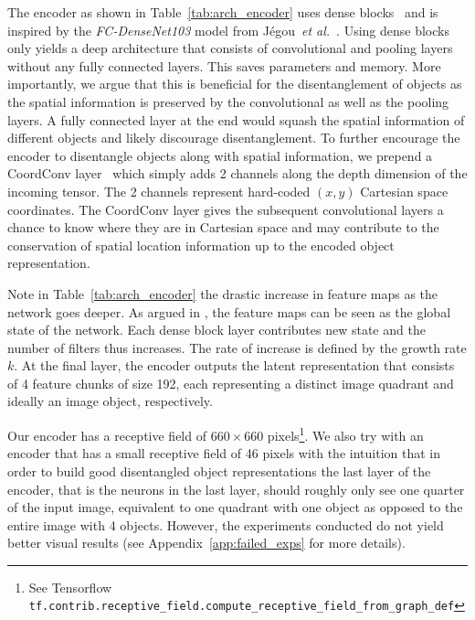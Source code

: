 \documentclass[12pt,a4paper]{article}
\begin{document}
The encoder as shown in Table~\ref{tab:arch_encoder} uses dense blocks~\cite{DenseNet} and is inspired by the \textit{FC-DenseNet103} model from Jégou~\textit{et al.}~\cite{Tiramisu}. Using dense blocks only yields a deep architecture that consists of convolutional and pooling layers without any fully connected layers. This saves parameters and memory. More importantly, we argue that this is beneficial for the disentanglement of objects as the spatial information is preserved by the convolutional as well as the pooling layers. A fully connected layer at the end would squash the spatial information of different objects and likely discourage disentanglement. To further encourage the encoder to disentangle objects along with spatial information, we prepend a CoordConv layer~\cite{CoordConv} which simply adds 2 channels along the depth dimension of the incoming tensor. The 2 channels represent hard-coded $(x,y)$ Cartesian space coordinates. The CoordConv layer gives the subsequent convolutional layers a chance to know where they are in Cartesian space and may contribute to the conservation of spatial location information up to the encoded object representation. 

Note in Table~\ref{tab:arch_encoder} the drastic increase in feature maps as the network goes deeper. As argued in \cite{DenseNet}, the feature maps can be seen as the global state of the network. Each dense block layer contributes new state and the number of filters thus increases. The rate of increase is defined by the growth rate $k$. At the final layer, the encoder outputs the latent representation that consists of 4 feature chunks of size 192, each representing a distinct image quadrant and ideally an image object, respectively.

Our encoder has a receptive field of $660 \times 660$ pixels\footnote{See Tensorflow \texttt{tf.contrib.receptive\_field.compute\_receptive\_field\_from\_graph\_def}}. We also try with an encoder that has a small receptive field of 46 pixels with the intuition that in order to build good disentangled object representations the last layer of the encoder, that is the neurons in the last layer, should roughly only see one quarter of the input image, equivalent to one quadrant with one object as opposed to the entire image with 4 objects. However, the experiments conducted do not yield better visual results (see Appendix~\ref{app:failed_exps} for more details).
\end{document}
